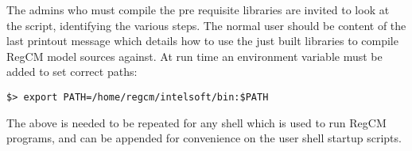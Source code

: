 The admins who must compile the pre requisite libraries are invited to look
at the script, identifying the various steps.
The normal user should be content of the last printout message which details
how to use the just built libraries to compile RegCM model sources against.
At run time an environment variable must be added to set correct paths:

\begin{Verbatim}
$> export PATH=/home/regcm/intelsoft/bin:$PATH
\end{Verbatim}

The above is needed to be repeated for any shell which is used to run
RegCM programs, and can be appended for convenience on the user shell
startup scripts.
